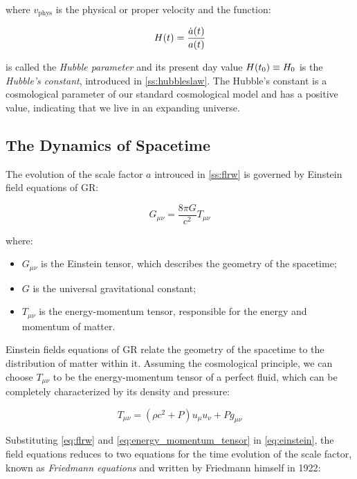 where $v_{\text{phys}}$ is the physical or proper velocity and the function:

\begin{equation}
        H\qty(t) = \frac{\dot a\qty(t)}{a\qty(t)}
        \label{eq:hubble_parameter}
\end{equation}

is called the \emph{Hubble parameter} and its present day value $H\qty(t_0)
\equiv H_0$ is the \emph{Hubble's constant}, introduced in
\autoref{ss:hubbleslaw}. The Hubble's constant is a cosmological
parameter of our standard cosmological model and has a positive value,
indicating that we live in an expanding universe.

\subsection{The Dynamics of Spacetime}

The evolution of the scale factor $a$ introuced in \autoref{ss:flrw} is
governed by Einstein field equations of GR:

\begin{equation}
        G_{\mu \nu} = \frac{8 \pi G}{c^2} T_{\mu \nu}
        \label{eq:einstein}
\end{equation}

where:

\begin{itemize}
        \item $G_{\mu \nu}$ is the Einstein tensor, which describes the
        geometry of the spacetime;
        \item $G$ is the universal gravitational constant;
        \item $T_{\mu \nu}$ is the energy-momentum tensor, responsible for
        the energy and momentum of matter.
\end{itemize}

Einstein fields equations of GR relate the geometry of the spacetime to the
distribution of matter within it. Assuming the cosmological principle, we
can choose $T_{\mu \nu}$ to be the energy-momentum tensor of a perfect
fluid, which can be completely characterized by its density and pressure:

\begin{equation}
         T_{\mu \nu} = (\rho c^2 + P)u_\mu u_\nu + P g_{\mu \nu}
         \label{eq:energy_momentum_tensor}
\end{equation}

Substituting \autoref{eq:flrw} and \autoref{eq:energy_momentum_tensor} in
\autoref{eq:einstein}, the field equations reduces to two equations for the
time evolution of the scale factor, known as \emph{Friedmann equations} and
written by Friedmann himself in 1922:

